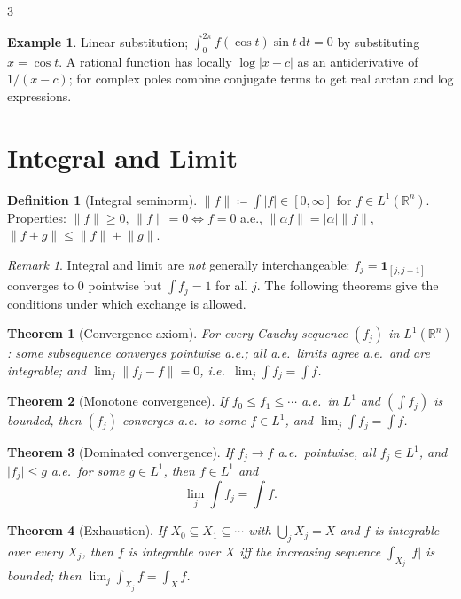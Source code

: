 \documentclass[10pt,a4paper,landscape]{article}
\theoremstyle{definition}
\newtheorem{defn}{Definition}[section]
\newtheorem{exm}{Example}[section]
\theoremstyle{plain}
\newtheorem{thm}{Theorem}[section]
\theoremstyle{remark}
\newtheorem{rem}{Remark}[section]
\newcommand{\R}{\mathbb{R}}
\newcommand{\dd}{\,\mathrm{d}}
\newcommand{\abs}[1]{\lvert #1 \rvert}
\newcommand{\norm}[1]{\lVert #1 \rVert}
\newcommand{\oo}{\infty}
\newcommand{\deq}{\coloneqq}
\newcommand{\One}[1]{\mathbf{1}_{#1}}
\begin{document}
\begin{multicols*}{3}
\begin{exm}
Linear substitution; $\int_0^{2\pi} f(\cos t)\sin t \dd t = 0$ by substituting $x = \cos t$. A rational function has locally $\log\abs{x - c}$ as an antiderivative of $1/(x-c)$; for complex poles combine conjugate terms to get real arctan and log expressions.
\end{exm}

\section{Integral and Limit}

\begin{defn}[Integral seminorm]
$\norm{f} \deq \int \abs{f} \in [0,\oo]$ for $f \in L^1(\R^n)$. Properties: $\norm{f} \ge 0$, $\norm{f} = 0 \iff f = 0$ a.e., $\norm{\alpha f} = \abs{\alpha}\norm{f}$, $\norm{f \pm g} \le \norm{f} + \norm{g}$.
\end{defn}

\begin{rem}
Integral and limit are \emph{not} generally interchangeable: $f_j = \One{[j, j+1]}$ converges to $0$ pointwise but $\int f_j = 1$ for all $j$. The following theorems give the conditions under which exchange is allowed.
\end{rem}

\begin{thm}[Convergence axiom]
For every Cauchy sequence $(f_j)$ in $L^1(\R^n)$: some subsequence converges pointwise a.e.; all a.e.\ limits agree a.e.\ and are integrable; and $\lim_j \norm{f_j - f} = 0$, i.e.\ $\lim_j \int f_j = \int f$.
\end{thm}

\begin{thm}[Monotone convergence]
If $f_0 \le f_1 \le \cdots$ a.e.\ in $L^1$ and $(\int f_j)$ is bounded, then $(f_j)$ converges a.e.\ to some $f \in L^1$, and $\lim_j \int f_j = \int f$.
\end{thm}

\begin{thm}[Dominated convergence]
If $f_j \to f$ a.e.\ pointwise, all $f_j \in L^1$, and $\abs{f_j} \le g$ a.e.\ for some $g \in L^1$, then $f \in L^1$ and
\[
\lim_j \int f_j = \int f .
\]
\end{thm}

\begin{thm}[Exhaustion]
If $X_0 \subseteq X_1 \subseteq \cdots$ with $\bigcup_j X_j = X$ and $f$ is integrable over every $X_j$, then $f$ is integrable over $X$ iff the increasing sequence $\int_{X_j} \abs{f}$ is bounded; then $\lim_j \int_{X_j} f = \int_X f$.
\end{thm}


\end{multicols*}
\end{document}
